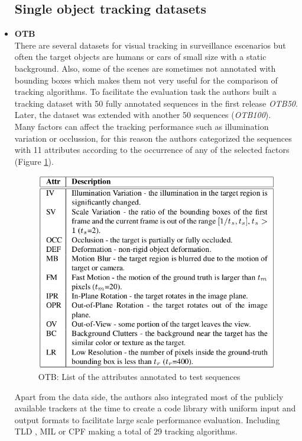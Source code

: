\begin{itemize}
\subsection{Single object tracking datasets}
\item \textbf{OTB} ~\cite{wu2013online}\\
There are several datasets for visual tracking in surveillance escenarios but often the target objects are humans or cars of small size with a static background. Also, some of the scenes are sometimes not annotated with bounding boxes which makes them not very useful for the comparison of tracking algorithms. To facilitate the evaluation task the authors built a tracking dataset with 50 fully annotated sequences in the first release \textit{OTB50}. Later, the dataset was extended with another 50 sequences (\textit{OTB100}).\\ Many factors can affect the tracking performance such as illumination variation or occlussion, for this reason the authors categorized the sequences with 11 attributes according to the occurrence of any of the selected factors (Figure \ref{fig:otb}).\\
\begin{figure}[H]
\begin{center}
\includegraphics[scale=0.3]{previous_version/otb_attributes.png}
\caption{OTB: List of the attributes annotated to test sequences ~\cite{wu2013online}}
\label{fig:otb}
\end{center}
\end{figure}
Apart from the data side, the authors also integrated most of the publicly available trackers at the time to create a code library with uniform input and output formats to facilitate large scale performance evaluation. Including TLD \cite{kalal2010pn}, MIL \cite{babenko2009visual} or CPF \cite{perez2002color} making a total of 29 tracking algorithms.

\end{itemize}
